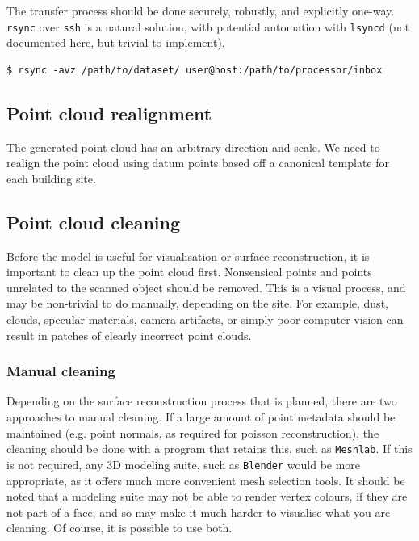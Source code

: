 The transfer process should be done securely, robustly, and explicitly one-way. {\tt rsync} over {\tt ssh} is a natural solution, with potential automation with {\tt lsyncd} (not documented here, but trivial to implement).

\begin{lstlisting}
$ rsync -avz /path/to/dataset/ user@host:/path/to/processor/inbox
\end{lstlisting}

\subsection{Point cloud realignment}

The generated point cloud has an arbitrary direction and scale. We need to realign the point cloud using datum points based off a canonical template for each building site.

\subsection{Point cloud cleaning}

Before the model is useful for visualisation or surface reconstruction, it is important to clean up the point cloud first. Nonsensical points and points unrelated to the scanned object should be removed. This is a visual process, and may be non-trivial to do manually, depending on the site. For example, dust, clouds, specular materials, camera artifacts, or simply poor computer vision can result in patches of clearly incorrect point clouds.

\subsubsection{Manual cleaning}
Depending on the surface reconstruction process that is planned, there are two approaches to manual cleaning. If a large amount of point metadata should be maintained (e.g. point normals, as required for poisson reconstruction), the cleaning should be done with a program that retains this, such as {\tt Meshlab}. If this is not required, any 3D modeling suite, such as {\tt Blender} would be more appropriate, as it offers much more convenient mesh selection tools. It should be noted that a modeling suite may not be able to render vertex colours, if they are not part of a face, and so may make it much harder to visualise what you are cleaning. Of course, it is possible to use both.


